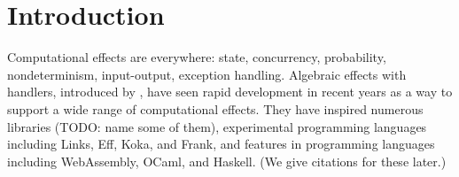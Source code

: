 \newcommand\ruledef{::=}
\newcommand\rulealt{\;|\;}
\newcommand\tyarr[2]{#1 \to #2}
\newcommand\tyany{\star}
\newcommand\cty[2]{#2 ! #1}
\newcommand\tynat{\mathrm{nat}}
\newcommand\tybool{\mathrm{bool}}
\newcommand\tyunit{\mathrm{unit}}
\newcommand\tystring{\mathrm{string}}
\newcommand\effany{\mbox{\tiny\FiveStarOpen}}
\newcommand\effop{\mathit{op}}
\newcommand\app[2]{#1\,#2}
\newcommand\lam[2]{\lambda\, #1 .\, #2}
\newcommand\cast[2]{#1 \,\MVAt\, #2}
\newcommand\tbox[2]{#1 \Uparrow #2}
\newcommand\blame{\mathrm{blame}}
\newcommand\perform[2]{#1\left(#2\right)}
\newcommand\handle[2]{\mathbf{handle}\,\{#1\}\,#2}
\newcommand\fori[3]{(#3)_{#1=1\dots #2}}
\newcommand\foriset[3]{\{#3\}_{#1=1\dots #2}}
\newcommand\treturn[1]{\mathbf{return}\,#1}
\newcommand\stepto{\longrightarrow}
\newcommand\stepsto{\stepto^\ast}
\newcommand\subst[3]{#1[#2/#3]}
\newcommand\context[2]{#1[#2]}
\newcommand\xC{\mathcal{C}}
\newcommand\xE{\mathcal{E}}
\newcommand\xP{\mathcal{P}}
\newcommand\bound[1]{\mathbf{bound}(#1)}
\newcommand\cid{\mathrm{id}}
\newcommand\commutel[3]{\mathbf{commutes}^l(#1,#2,#3)}
\newcommand\commuter[3]{\mathbf{commutes}^r(#1,#2,#3)}
\newcommand\cod[1]{\mathrm{cod}(#1)}
\newcommand\codeff[1]{\mathrm{eff}(#1)}
\newcommand\dom[1]{\mathrm{dom}(#1)}
\newcommand\typeof[1]{\mathrm{typeof}(#1)}
\newcommand\dprime{{\prime\prime}}

\newcommand\Term[3]{#1 \vdash #2 : #3}
\newcommand\TermP[4]{#1 \vdash #2 \le #3 : #4}

\newcommand\dhandler{{\color{red}\texttt{library}}}
\newcommand\shandler{{\color{blue}\texttt{library}}}
\newcommand\dclient{{\color{red}\texttt{client}}}
\newcommand\sclient{{\color{blue}\texttt{client}}}

\newcommand\eflog{{[\texttt{Log}]}}
\newcommand\efnone{[]}

\section{Introduction}

Computational effects are everywhere: state, concurrency, probability,
nondeterminism, input-output, exception handling. Algebraic effects with handlers,
introduced by \citet{plotkin-pretnar-2009},
have seen rapid development in recent years as a way to support a wide range
of computational effects. They have inspired numerous libraries (TODO: name some of them), experimental
programming languages including Links, Eff, Koka, and Frank, and features
in programming languages including WebAssembly, OCaml, and Haskell.
(We give citations for these later.)

